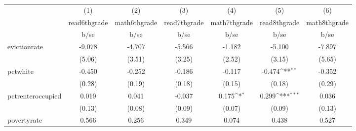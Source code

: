 {
\def\sym#1{\ifmmode^{#1}\else\(^{#1}\)\fi}
\begin{tabular}{l*{6}{c}}
\hline\hline
            &\multicolumn{1}{c}{(1)}           &\multicolumn{1}{c}{(2)}           &\multicolumn{1}{c}{(3)}           &\multicolumn{1}{c}{(4)}           &\multicolumn{1}{c}{(5)}           &\multicolumn{1}{c}{(6)}           \\
            &\multicolumn{1}{c}{read6thgrade}  &\multicolumn{1}{c}{math6thgrade}  &\multicolumn{1}{c}{read7thgrade}  &\multicolumn{1}{c}{math7thgrade}  &\multicolumn{1}{c}{read8thgrade}  &\multicolumn{1}{c}{math8thgrade}  \\
            &                     b/se         &                     b/se         &                     b/se         &                     b/se         &                     b/se         &                     b/se         \\
\hline
evictionrate&                   -9.078         &                   -4.707         &                   -5.566         &                   -1.182         &                   -5.100         &                   -7.897         \\
            &                   (5.06)         &                   (3.51)         &                   (3.25)         &                   (2.52)         &                   (3.15)         &                   (5.65)         \\
pctwhite    &                   -0.450         &                   -0.252         &                   -0.186         &                   -0.117         &                   -0.474\sym{**} &                   -0.352         \\
            &                   (0.28)         &                   (0.19)         &                   (0.18)         &                   (0.15)         &                   (0.18)         &                   (0.29)         \\
pctrenteroccupied&                    0.019         &                    0.041         &                   -0.037         &                    0.175\sym{*}  &                    0.299\sym{***}&                    0.036         \\
            &                   (0.13)         &                   (0.08)         &                   (0.09)         &                   (0.07)         &                   (0.09)         &                   (0.13)         \\
povertyrate &                    0.566         &                    0.256         &                    0.349         &                    0.074         &                    0.438         &                    0.527         \\

\end{tabular}}
